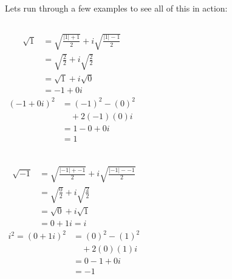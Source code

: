 \documentclass{beamer}
\begin{document}
\begin{frame}
  Lets run through a few examples to see all of this in action:
  \begin{columns}
    \begin{align*}
      \sqrt{1} & = \sqrt{\frac{|1| + 1}{2}} + i\sqrt{\frac{|1| - 1}{2}} \\
               & = \sqrt{\frac{2}{2}} + i\sqrt{\frac{2}{2}}             \\
               & = \sqrt{1} + i\sqrt{0}                                 \\
               & = -1 + 0i
    \end{align*}
    \begin{align*}
      (-1 + 0i)^2 & = (-1)^2 - (0)^2  \\
                  & \quad + 2(-1)(0)i \\
                  & = 1 - 0 + 0i      \\
                  & = 1               \\
    \end{align*}
  \end{columns}
\end{frame}

\begin{frame}
  \begin{columns}
    \begin{align*}
      \sqrt{-1} & = \sqrt{\frac{|-1| + -1}{2}} + i\sqrt{\frac{|-1| - -1}{2}} \\
                & = \sqrt{\frac{0}{2}} + i\sqrt{\frac{2}{2}}                 \\
                & = \sqrt{0} + i\sqrt{1}                                     \\
                & = 0 + 1i = i
    \end{align*}
    \begin{align*}
      i^2 = (0 + 1i)^2 & = (0)^2 - (1)^2  \\
                       & \quad + 2(0)(1)i \\
                       & = 0 - 1 + 0i     \\
                       & = -1
    \end{align*}
  \end{columns}
\end{frame}
\end{document}
